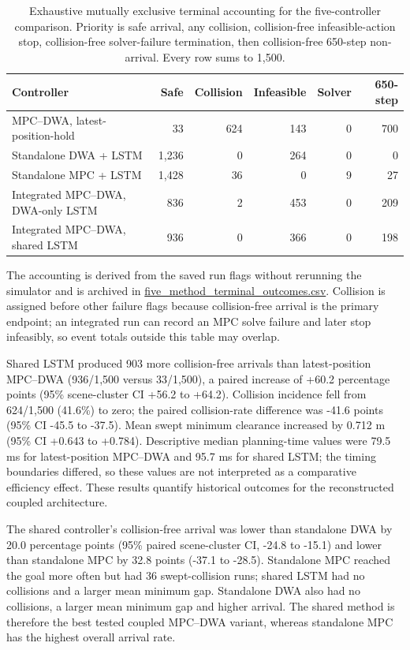 \documentclass[10pt]{article}
\begin{document}
\begin{table}[H]
\centering
\caption{Exhaustive mutually exclusive terminal accounting for the five-controller comparison. Priority is safe arrival, any collision, collision-free infeasible-action stop, collision-free solver-failure termination, then collision-free 650-step non-arrival. Every row sums to 1,500.}
\label{tab:terminal-accounting}
\scriptsize
\renewcommand{\arraystretch}{1.12}
\setlength{\tabcolsep}{3.5pt}
\begin{tabularx}{\linewidth}{@{}>{\raggedright\arraybackslash}Xrrrrr@{}}
\toprule
Controller & Safe & Collision & Infeasible & Solver & 650-step \\
\midrule
MPC--DWA, latest-position-hold & 33 & 624 & 143 & 0 & 700 \\
Standalone DWA + LSTM & 1,236 & 0 & 264 & 0 & 0 \\
Standalone MPC + LSTM & 1,428 & 36 & 0 & 9 & 27 \\
Integrated MPC--DWA, DWA-only LSTM & 836 & 2 & 453 & 0 & 209 \\
Integrated MPC--DWA, shared LSTM & 936 & 0 & 366 & 0 & 198 \\
\bottomrule
\end{tabularx}
\end{table}

The accounting is derived from the saved run flags without rerunning the simulator and is archived in \url{five_method_terminal_outcomes.csv}. Collision is assigned before other failure flags because collision-free arrival is the primary endpoint; an integrated run can record an MPC solve failure and later stop infeasibly, so event totals outside this table may overlap.

Shared LSTM produced 903 more collision-free arrivals than latest-position MPC--DWA (936/1,500 versus 33/1,500), a paired increase of +60.2 percentage points (95\% scene-cluster CI +56.2 to +64.2). Collision incidence fell from 624/1,500 (41.6\%) to zero; the paired collision-rate difference was -41.6 points (95\% CI -45.5 to -37.5). Mean swept minimum clearance increased by 0.712 m (95\% CI +0.643 to +0.784). Descriptive median planning-time values were 79.5 ms for latest-position MPC--DWA and 95.7 ms for shared LSTM; the timing boundaries differed, so these values are not interpreted as a comparative efficiency effect. These results quantify historical outcomes for the reconstructed coupled architecture.

The shared controller's collision-free arrival was lower than standalone DWA by 20.0 percentage points (95\% paired scene-cluster CI, -24.8 to -15.1) and lower than standalone MPC by 32.8 points (-37.1 to -28.5). Standalone MPC reached the goal more often but had 36 swept-collision runs; shared LSTM had no collisions and a larger mean minimum gap. Standalone DWA also had no collisions, a larger mean minimum gap and higher arrival. The shared method is therefore the best tested coupled MPC--DWA variant, whereas standalone MPC has the highest overall arrival rate.
\end{document}
